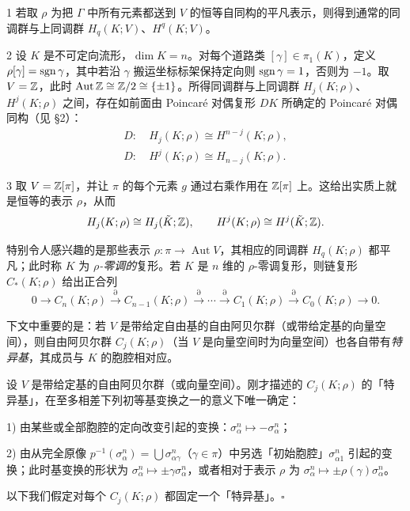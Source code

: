 \begin{example}{1}
若取 $\rho$ 为把 $\Gamma$ 中所有元素都送到 $V$ 的恒等自同构的平凡表示，则得到通常的同调群与上同调群 $H_q(K;V)$、$H^q(K;V)$。
\end{example}

\begin{example}{2}
设 $K$ 是不可定向流形，$\dim K=n$。对每个道路类 $[\gamma]\in\pi_1(K)$，定义 $\rho[\gamma]=\operatorname{sgn}\gamma$，其中若沿 $\gamma$ 搬运坐标标架保持定向则 $\operatorname{sgn}\gamma=1$，否则为 $-1$。取 $V=\mathbb{Z}$，此时 $\operatorname{Aut}\mathbb{Z}\cong\mathbb{Z}/2\cong\{\pm1\}$。所得同调群与上同调群 $H_j(K;\rho)$、$H^j(K;\rho)$ 之间，存在如前面由 Poincaré 对偶复形 $DK$ 所确定的 Poincaré 对偶同构（见 §2）：
\begin{equation}
\begin{aligned}
  D\colon&\ H_j(K;\rho)\cong H^{n-j}(K;\rho),\\
  D\colon&\ H^j(K;\rho)\cong H_{n-j}(K;\rho).
\end{aligned}\tag{5.4}
\end{equation}
\end{example}

\begin{example}{3}
取 $V=\mathbb{Z}[\pi]$，并让 $\pi$ 的每个元素 $g$ 通过右乘作用在 $\mathbb{Z}[\pi]$ 上。这给出实质上就是恒等的表示 $\rho$，从而
\[
  H_j(K;\rho)\cong H_j(\tilde K;\mathbb{Z}),\qquad H^j(K;\rho)\cong H^j(\tilde K;\mathbb{Z}).
\]
\end{example}

特别令人感兴趣的是那些表示 $\rho\colon\pi\to\operatorname{Aut}V$，其相应的同调群 $H_q(K;\rho)$ 都平凡；此时称 $K$ 为 \emph{$\rho$-零调的}复形。若 $K$ 是 $n$ 维的 $\rho$-零调复形，则链复形 $C_*(K;\rho)$ 给出正合列
\begin{equation}
  0\longrightarrow C_n(K;\rho)\xrightarrow{\partial}C_{n-1}(K;\rho)\xrightarrow{\partial}\cdots\xrightarrow{\partial}C_1(K;\rho)\xrightarrow{\partial}C_0(K;\rho)\longrightarrow 0. \tag{5.5}
\end{equation}

下文中重要的是：若 $V$ 是带给定自由基的自由阿贝尔群（或带给定基的向量空间），则自由阿贝尔群 $C_j(K;\rho)$（当 $V$ 是向量空间时为向量空间）也各自带有\emph{特异基}，其成员与 $K$ 的胞腔相对应。

\begin{remark}{}
设 $V$ 是带给定基的自由阿贝尔群（或向量空间）。刚才描述的 $C_j(K;\rho)$ 的「特异基」，在至多相差下列初等基变换之一的意义下唯一确定：

1) 由某些或全部胞腔的定向改变引起的变换：$\sigma^n_\alpha\mapsto-\sigma^n_\alpha$；

2) 由从完全原像 $p^{-1}(\sigma^n_\alpha)=\bigcup\sigma^n_{\alpha\gamma}$（$\gamma\in\pi$）中另选「初始胞腔」$\sigma^n_{\alpha 1}$ 引起的变换；此时基变换的形状为 $\sigma^n_\alpha\mapsto\pm\gamma\sigma^n_\alpha$，或者相对于表示 $\rho$ 为 $\sigma^n_\alpha\mapsto\pm\rho(\gamma)\sigma^n_\alpha$。

以下我们假定对每个 $C_j(K;\rho)$ 都固定一个「特异基」。\hfill$\square$
\end{remark}

